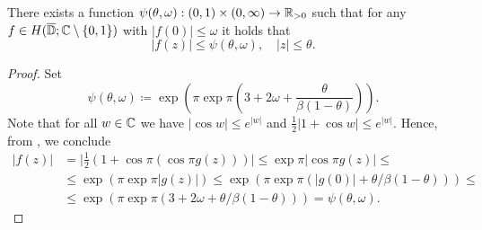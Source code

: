 \begin{theorem}[Schottky] \label{thm:schottky}
    There exists a function ${\psi(\theta, \omega) : (0, 1) \times (0, \infty) \to \mathbb{R}_{>0}}$ such that for any $f \in H(\overline{\mathbb{D}}; \mathbb{C} \setminus \{ 0, 1 \})$ with $\vert f(0) \vert \leq \omega$ it holds that
    \begin{equation}
        \vert f(z) \vert \leq \psi(\theta, \omega), \quad \vert z \vert \leq \theta.
    \end{equation}
\end{theorem}

\begin{proof}
    Set
    \begin{equation*}
        \psi(\theta, \omega) \coloneqq \exp \left( \pi \exp \pi \left( 3 + 2 \omega + \frac{\theta}{\beta (1 - \theta)} \right) \right).
    \end{equation*}
    Note that for all $w \in \mathbb{C}$ we have $\vert \cos w \vert \leq e^{\vert w \vert}$ and $\frac{1}{2} \vert 1 + \cos w \vert \leq e^{\vert w \vert}$. Hence, from , we conclude
    \begin{align*}
        \vert f(z) \vert &= \vert {\textstyle \frac{1}{2}} ( 1 + \cos \pi ( \cos \pi g(z) ) ) \vert \leq \exp \pi \vert \cos \pi g(z) \vert \leq \\
        &\leq \exp ( \pi \exp \pi \vert g(z) \vert ) \leq \exp (\pi \exp \pi (\vert g(0) \vert + \theta / \beta(1 - \theta))) \leq \\
        &\leq \exp ( \pi \exp \pi ( 3 + 2 \omega + \theta / \beta(1 - \theta) ) ) = \psi(\theta, \omega).
    \end{align*}
\end{proof}